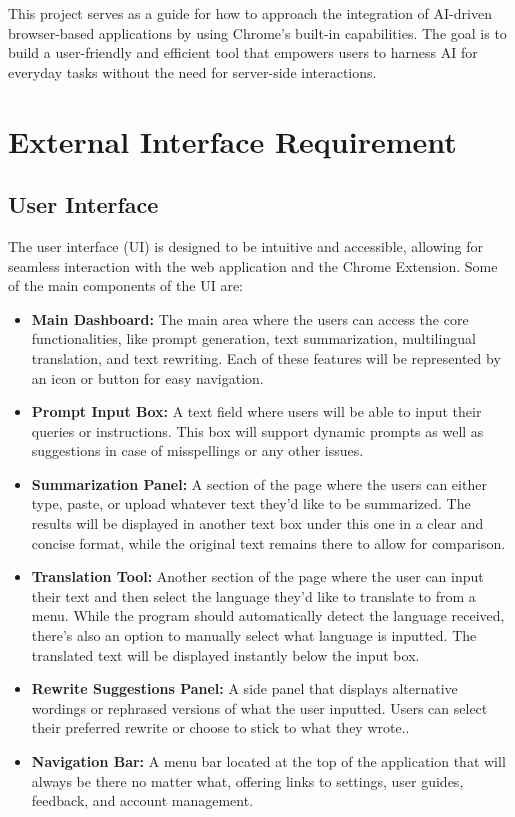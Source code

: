 \documentclass{article}
\begin{document}
This project serves as a guide for how to approach the integration of AI-driven browser-based applications by using Chrome’s built-in capabilities. The goal is to build a user-friendly and efficient tool that empowers users to harness AI for everyday tasks without the need for server-side interactions.

\section{External Interface Requirement}
\subsection{User Interface}
The user interface (UI) is designed to be intuitive and accessible, allowing for seamless interaction with the web application and the Chrome Extension. Some of the main components of the UI are:

\begin{itemize}
    \item \textbf{Main Dashboard:} The main area where the users can access the core functionalities, like prompt generation, text summarization, multilingual translation, and text rewriting. Each of these features will be represented by an icon or button for easy navigation.
    \item \textbf{Prompt Input Box:} A text field where users will be able to input their queries or instructions. This box will support dynamic prompts as well as suggestions in case of misspellings or any other issues.
    \item \textbf{Summarization Panel:} A section of the page where the users can either type, paste, or upload whatever text they'd like to be summarized. The results will be displayed in another text box under this one in a clear and concise format, while the original text remains there to allow for comparison.
    \item \textbf{Translation Tool:} Another section of the page where the user can input their text and then select the language they'd like to translate to from a menu. While the program should automatically detect the language received, there's also an option to manually select what language is inputted. The translated text will be displayed instantly below the input box.
    \item \textbf{Rewrite Suggestions Panel:} A side panel that displays alternative wordings or rephrased versions of what the user inputted. Users can select their preferred rewrite or choose to stick to what they wrote..
    \item \textbf{Navigation Bar:} A menu bar located at the top of the application that will always be there no matter what, offering links to settings, user guides, feedback, and account management.
\end{itemize}
\end{document}
